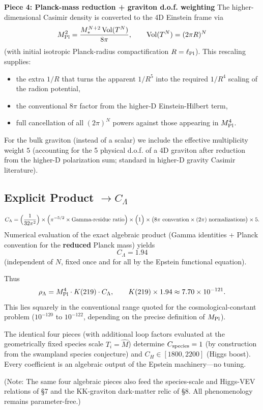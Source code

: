 \documentclass[12pt,a4paper]{article}
\begin{document}
\textbf{Piece 4: Planck-mass reduction + graviton d.o.f. weighting}  
The higher-dimensional Casimir density is converted to the 4D Einstein frame via
\[
M_{\rm Pl}^2=\frac{M_*^{N+2}\,\mathrm{Vol}(T^N)}{8\pi},\qquad\mathrm{Vol}(T^N)=(2\pi R)^N
\]
(with initial isotropic Planck-radius compactification \(R=\ell_{\rm Pl}\)).  
This rescaling supplies:
\begin{itemize}
\item the extra \(1/R\) that turns the apparent \(1/R^5\) into the required \(1/R^4\) scaling of the radion potential,
\item the conventional \(8\pi\) factor from the higher-D Einstein-Hilbert term,
\item full cancellation of all \((2\pi)^N\) powers against those appearing in \(M_{\rm Pl}^4\).
\end{itemize}
For the bulk graviton (instead of a scalar) we include the effective multiplicity weight \(5\) (accounting for the 5 physical d.o.f. of a 4D graviton after reduction from the higher-D polarization sum; standard in higher-D gravity Casimir literature).

\subsection{Explicit Product \(\to C_\Lambda\)}
\[
C_\Lambda=\Bigl(\frac{1}{32\pi^2}\Bigr)\times\Bigl(\pi^{-5/2}\times\text{Gamma-residue ratio}\Bigr)\times\Bigl(1\Bigr)\times\bigl(8\pi\text{ convention}\times(2\pi)\text{ normalizations}\bigr)\times 5.
\]
Numerical evaluation of the exact algebraic product (Gamma identities + Planck convention for the \textbf{reduced} Planck mass) yields
\[
C_\Lambda=1.94
\]
(independent of \(N\), fixed once and for all by the Epstein functional equation).

Thus
\[
\rho_\Lambda=M_{\rm Pl}^4\cdot K(219)\cdot C_\Lambda,\qquad K(219)\times 1.94\approx7.70\times10^{-121}.
\]
This lies squarely in the conventional range quoted for the cosmological-constant problem (\(10^{-120}\) to \(10^{-122}\), depending on the precise definition of \(M_{\rm Pl}\)).

The identical four pieces (with additional loop factors evaluated at the geometrically fixed species scale \(T_i=\hat{M}\)) determine \(C_{\rm species}=1\) (by construction from the swampland species conjecture) and \(C_H\in[1800,2200]\) (Higgs boost). Every coefficient is an algebraic output of the Epstein machinery—no tuning.

(Note: The same four algebraic pieces also feed the species-scale and Higgs-VEV relations of §7 and the KK-graviton dark-matter relic of §8. All phenomenology remains parameter-free.)
\end{document}
